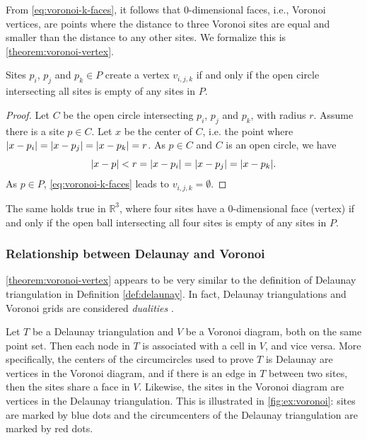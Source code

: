 From \autoref{eq:voronoi-k-faces}, it follows that 0-dimensional faces, i.e., Voronoi vertices, are points where the distance to three Voronoi sites are equal and smaller than the distance to any other sites. We formalize this is \autoref{theorem:voronoi-vertex}.

\begin{theorem}
\label{theorem:voronoi-vertex}
Sites $p_i$, $p_j$ and $p_k \in P$ create a vertex $v_{i, j, k}$ if and only if the open circle intersecting all sites is empty of any sites in $P$. 
\end{theorem}
\begin{proof}
Let $C$ be the open circle intersecting $p_i$, $p_j$ and $p_k$, with radius $r$. Assume there is a site $p \in C$. Let $x$ be the center of $C$, i.e. the point where $\lvert x - p_i\rvert = \lvert x - p_j\rvert = \lvert x - p_k\rvert = r$. As $p \in C$ and $C$ is an open circle, we have
\begin{equation*}
    \lvert x - p\rvert < r = \lvert x - p_i\rvert = \lvert x - p_j\rvert = \lvert x - p_k\rvert.
\end{equation*}
As $p \in P$, \autoref{eq:voronoi-k-faces} leads to $v_{i, j, k} = \emptyset$.
\end{proof}
The same holds true in $\mathbb{R}^3$, where four sites have a 0-dimensional face (vertex) if and only if the open ball intersecting all four sites is empty of any sites in $P$.

\subsubsection{Relationship between Delaunay and Voronoi}
\autoref{theorem:voronoi-vertex} appears to be very similar to the definition of Delaunay triangulation in Definition \ref{def:delaunay}. In fact, Delaunay triangulations and Voronoi grids are considered \emph{dualities} \cite{UPR_chapter}.


Let $T$ be a Delaunay triangulation and $V$ be a Voronoi diagram, both on the same point set. Then each node in $T$ is associated with a cell in $V$, and vice versa. More specifically, the centers of the circumcircles used to prove $T$ is Delaunay are vertices in the Voronoi diagram, and if there is an edge in $T$ between two sites, then the sites share a face in $V$. Likewise, the sites in the Voronoi diagram are vertices in the Delaunay triangulation. This is illustrated in \autoref{fig:ex:voronoi}: sites are marked by blue dots and the circumcenters of the Delaunay triangulation are marked by red dots.


